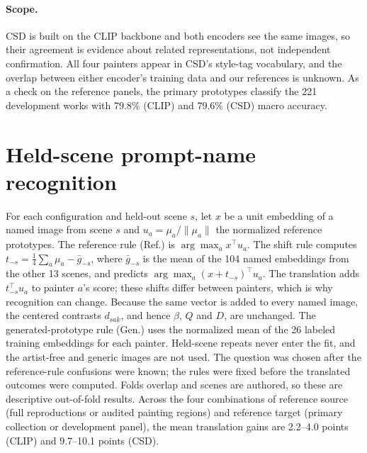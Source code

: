 



\paragraph{Scope.} CSD is built on the CLIP backbone and both encoders see the same images, so
their agreement is evidence about related representations, not independent confirmation. All
four painters appear in CSD's style-tag vocabulary, and the overlap between either encoder's
training data and our references is unknown. As a check on the reference panels, the primary
prototypes classify the 221 development works with 79.8\% (CLIP) and 79.6\% (CSD) macro
accuracy.

\FloatBarrier
\section{Held-scene prompt-name recognition}\label{app:transfer}



For each configuration and held-out scene $s$, let $x$ be a unit embedding of a named image
from scene $s$ and $u_a=\mu_a/\|\mu_a\|$ the normalized reference prototypes. The reference rule
(Ref.) is $\arg\max_a x^\top u_a$. The shift rule computes $t_{-s}=\frac14\sum_a\mu_a-\bar
g_{-s}$, where $\bar g_{-s}$ is the mean of the 104 named embeddings from the other 13 scenes,
and predicts $\arg\max_a(x+t_{-s})^\top u_a$. The translation adds $t_{-s}^\top u_a$ to painter
$a$'s score; these shifts differ between painters, which is why recognition can change. Because the
same vector is added to every named image, the centered contrasts $d_{sak}$, and hence $\beta$, $Q$
and $D$, are unchanged. The generated-prototype rule (Gen.) uses the normalized mean of the 26
labeled training embeddings for each painter. Held-scene repeats never enter the fit, and the
artist-free and generic images are not used. The question was chosen after the reference-rule
confusions were known; the rules were fixed before the translated outcomes were computed. Folds
overlap and scenes are authored, so these are descriptive out-of-fold results. Across the four
combinations of reference source (full reproductions or audited painting regions) and reference
target (primary collection or development panel), the mean translation gains are 2.2--4.0 points
(CLIP) and 9.7--10.1 points (CSD).

